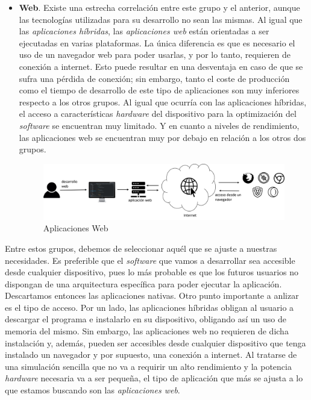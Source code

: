 \documentclass[../main.tex]{subfiles}
\begin{document}
\begin{itemize}
    \item \textbf{Web}. Existe una estrecha correlación entre este grupo y el anterior, aunque las tecnologías utilizadas para su desarrollo no sean las mismas. Al igual que las \textit{aplicaciones híbridas}, las \textit{aplicaciones web} están orientadas a ser ejecutadas en varias plataformas. La única diferencia es que es necesario el uso de un navegador web para poder usarlas, y por lo tanto, requieren de conexión a internet. Esto puede resultar en una desventaja en caso de que se sufra una pérdida de conexión; sin embargo, tanto el coste de producción como el tiempo de desarrollo de este tipo de aplicaciones son muy inferiores respecto a los otros grupos. Al igual que ocurría con las aplicaciones híbridas, el acceso a características \textit{hardware} del dispositivo para la optimización del \textit{software} se encuentran muy limitado. Y en cuanto a niveles de rendimiento, las aplicaciones web se encuentran muy por debajo en relación a los otros dos grupos.
    
    \begin{figure}[!h]
          \centering
          \includegraphics[width=\textwidth]{images/aplicaciones_web.png}
          \caption{Aplicaciones Web}
          \label{fig:aplicaciones_web}
      \end{figure}
    
    \end{itemize}
    
    Entre estos grupos, debemos de seleccionar aquél que se ajuste a nuestras necesidades. Es preferible que el \textit{software} que vamos a desarrollar sea accesible desde cualquier dispositivo, pues lo más probable es que los futuros usuarios no dispongan de una arquitectura específica para poder ejecutar la aplicación. Descartamos entonces las aplicaciones nativas. Otro punto importante a anlizar es el tipo de acceso. Por un lado, las aplicaciones híbridas obligan al usuario a descargar el programa e instalarlo en su dispositivo, obligando así un uso de memoria del mismo. Sin embargo, las aplicaciones web no requieren de dicha instalación y, además, pueden ser accesibles desde cualquier dispositivo que tenga instalado un navegador y por supuesto, una conexión a internet. Al tratarse de una simulación sencilla que no va a requirir un alto rendimiento y la potencia \textit{hardware} necesaria va a ser pequeña, el tipo de aplicación que más se ajusta a lo que estamos buscando son las \textit{aplicaciones web}.
    
\end{document}
